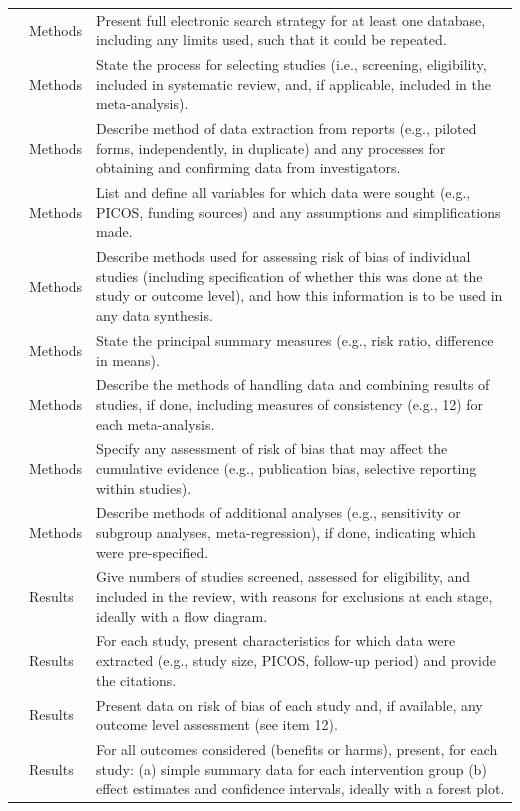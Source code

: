 \documentclass[
  man,floatsintext]{apa6}
\begin{document}
\begin{longtable}[t]{>{\raggedleft\arraybackslash}p{5em}>{\raggedright\arraybackslash}p{5em}>{\raggedright\arraybackslash}p{32em}}
8 & Methods & Present full electronic search strategy for at least one database, including any limits used, such that it could be repeated.\\
9 & Methods & State the process for selecting studies (i.e., screening, eligibility, included in systematic review, and, if applicable, included in the meta-analysis).\\
10 & Methods & Describe method of data extraction from reports (e.g., piloted forms, independently, in duplicate) and any processes for obtaining and confirming data from investigators.\\
11 & Methods & List and define all variables for which data were sought (e.g., PICOS, funding sources) and any assumptions and simplifications made.\\
12 & Methods & Describe methods used for assessing risk of bias of individual studies (including specification of whether this was done at the study or outcome level), and how this information is to be used in any data synthesis.\\
13 & Methods & State the principal summary measures (e.g., risk ratio, difference in means).\\
14 & Methods & Describe the methods of handling data and combining results of studies, if done, including measures of consistency (e.g., 12) for each meta-analysis.\\
15 & Methods & Specify any assessment of risk of bias that may affect the cumulative evidence (e.g., publication bias, selective reporting within studies).\\
16 & Methods & Describe methods of additional analyses (e.g., sensitivity or subgroup analyses, meta-regression), if done, indicating which were pre-specified.\\
17 & Results & Give numbers of studies screened, assessed for eligibility, and included in the review, with reasons for exclusions at each stage, ideally with a flow diagram.\\
18 & Results & For each study, present characteristics for which data were extracted (e.g., study size, PICOS, follow-up period) and provide the citations.\\
19 & Results & Present data on risk of bias of each study and, if available, any outcome level assessment (see item 12).\\
20 & Results & For all outcomes considered (benefits or harms), present, for each study: (a) simple summary data for each intervention group (b) effect estimates and confidence intervals, ideally with a forest plot.\\

\end{longtable}
\end{document}
